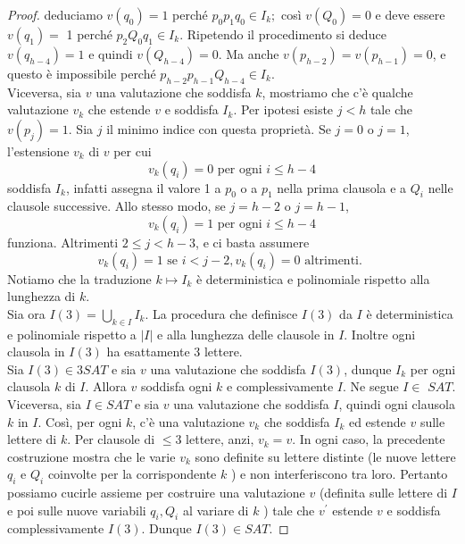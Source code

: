 \begin{proof}
    deduciamo $v\left(q_0\right)=1$ perché $p_0 p_1 q_0 \in I_k ;$ così $v\left(Q_0\right)=0$ e deve essere $v\left(q_1\right)=$ 1 perché $p_2 Q_0 q_1 \in I_k$. Ripetendo il procedimento si deduce $v\left(q_{h-4}\right)=1$ e quindi $v\left(Q_{h-4}\right)=0$. Ma anche $v\left(p_{h-2}\right)=v\left(p_{h-1}\right)=0$, e questo è impossibile perché $p_{h-2} p_{h-1} Q_{h-4} \in I_k$.\\
    Viceversa, sia $v$ una valutazione che soddisfa $k$, mostriamo che c'è qualche valutazione $v_k$ che estende $v$ e soddisfa $I_k$. Per ipotesi esiste $j<h$ tale che $v\left(p_j\right)=1$. Sia $j$ il minimo indice con questa proprietà. Se $j=0$ o $j=1$, l'estensione $v_k$ di $v$ per cui
    $$
        v_k\left(q_i\right)=0 \text { per ogni } i \leq h-4
    $$
    soddisfa $I_k$, infatti assegna il valore 1 a $p_0$ o a $p_1$ nella prima clausola e a $Q_i$ nelle clausole successive. Allo stesso modo, se $j=h-2$ o $j=h-1$,
    $$
        v_k\left(q_i\right)=1 \text { per ogni } i \leq h-4
    $$
    funziona. Altrimenti $2 \leq j<h-3$, e ci basta assumere
    $$
        v_k\left(q_i\right)=1 \text { se } i<j-2, v_k\left(q_i\right)=0 \text { altrimenti. }
    $$
    Notiamo che la traduzione $k \mapsto I_k$ è deterministica e polinomiale rispetto alla lunghezza di $k$.\\
    Sia ora $I(3)=\bigcup_{k \in I} I_k$. La procedura che definisce $I(3)$ da $I$ è deterministica e polinomiale rispetto a $|I|$ e alla lunghezza delle clausole in $I$. Inoltre ogni clausola in $I(3)$ ha esattamente 3 lettere.\\
    Sia $I(3) \in 3 S A T$ e sia $v$ una valutazione che soddisfa $I(3)$, dunque $I_k$ per ogni clausola $k$ di $I$. Allora $v$ soddisfa ogni $k$ e complessivamente $I$. Ne segue $I \in$ $S A T$.\\
    Viceversa, sia $I \in S A T$ e sia $v$ una valutazione che soddisfa $I$, quindi ogni clausola $k$ in $I$. Così, per ogni $k$, c'è una valutazione $v_k$ che soddisfa $I_k$ ed estende $v$ sulle lettere di $k$. Per clausole di $\leq 3$ lettere, anzi, $v_k=v$. In ogni caso, la precedente costruzione mostra che le varie $v_k$ sono definite su lettere distinte (le nuove lettere $q_i$ e $Q_i$ coinvolte per la corrispondente $k$ ) e non interferiscono tra loro. Pertanto possiamo cucirle assieme per costruire una valutazione $v$ (definita sulle lettere di $I$ e poi sulle nuove variabili $q_i, Q_i$ al variare di $k$ ) tale che $v^{\prime}$ estende $v$ e soddisfa complessivamente $I(3)$. Dunque $I(3) \in S A T$.
\end{proof}

